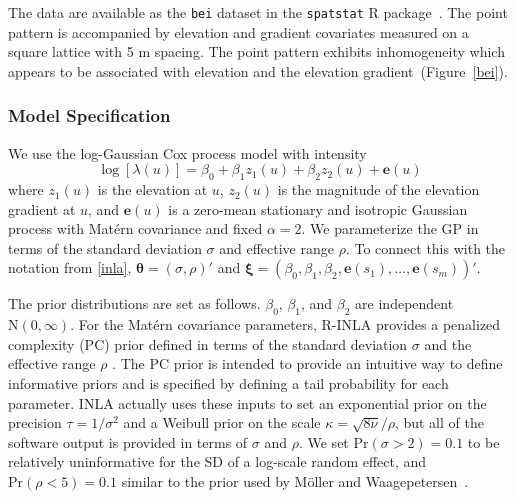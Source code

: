 \documentclass[]{interact}
\begin{document}
The data are available as the \texttt{bei} dataset in the \texttt{spatstat} R
package~\cite{spatstat}. The point pattern is accompanied by elevation and
gradient covariates measured on a square lattice with 5 m spacing. The point
pattern exhibits inhomogeneity which appears to be associated with elevation
and the elevation gradient~(Figure~\ref{bei}).


\subsubsection{Model Specification}
\label{beimodel}

We use the log-Gaussian Cox process model with intensity
\begin{displaymath}
\log\left[\lambda(u)\right] = \beta_{0} + \beta_{1} z_{1}(u)
+ \beta_{2} z_{2}(u) + \mathbf{e}(u)
\end{displaymath}
where \(z_{1}(u)\) is the elevation at \(u\), \(z_{2}(u)\) is the magnitude of
the elevation gradient at \(u\), and \(\mathbf{e}(u)\) is a zero-mean
stationary and isotropic Gaussian process with Mat\'{e}rn covariance and fixed
\(\alpha = 2\). We parameterize the GP in terms of the standard deviation
\(\sigma\) and effective range \(\rho\). To connect this with the notation
from \ref{inla}, \(\boldsymbol{\theta} = (\sigma, \rho)'\) and
\(\boldsymbol{\xi} = (\beta_{0}, \beta_{1}, \beta_{2}, \mathbf{e}(s_{1}),
\dots, \mathbf{e}(s_{m}))'\).

The prior distributions are set as follows. \(\beta_{0}\), \(\beta_{1}\), and
\(\beta_{2}\) are independent \(\mathrm{N}(0, \infty)\). For the Mat\'{e}rn
covariance parameters, R-INLA provides a penalized complexity (PC) prior
defined in terms of the standard deviation \(\sigma\) and the effective range
\(\rho\) \cite{fuglstadetal,simpsonpc}. The PC prior is intended to provide an
intuitive way to define informative priors and is specified by defining a tail
probability for each parameter. INLA actually uses these inputs to set an
exponential prior on the precision \(\tau = 1 / \sigma^{2}\) and a Weibull
prior on the scale \(\kappa = \sqrt{8 \nu} / \rho\), but all of the software output
is provided in terms of \(\sigma\) and \(\rho\). We set
\(\mathrm{Pr}(\sigma > 2) = 0.1\) to be relatively uninformative for the SD of
a log-scale random effect, and \(\mathrm{Pr}(\rho < 5) = 0.1\) similar to the
prior used by M\"{o}ller and Waagepetersen~\cite{moellerwaagepetersen}.
\end{document}
